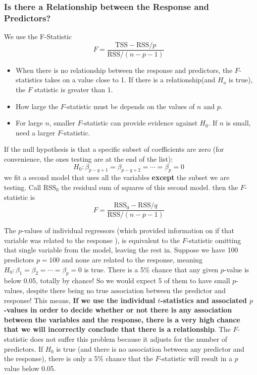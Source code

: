          \subsubsection*{Is there a Relationship between the Response and Predictors?}
         We use the F-Statistic
         \begin{equation*}\tag{3.23}
             F = \frac{\text{TSS}-\text{RSS}/p}{\text{RSS}/(n-p-1)}
          \end{equation*}
          \begin{itemize}
              \item When there is no relationship between the response and predictors, the $F$-statistics takes on a value close to 1.  If there is a relationship(and $H_a$ is true), the $F$ statistic is greater than 1.
              \item How large the $F$-statistic must be depends on the values of $n$ and $p$.
              \item For large $n$, smaller $F$-statistic can provide evidence against $H_0$.  If $n$ is small, need a larger $F$-statistic.
          \end{itemize}
          If the null hypothesis is that a specific subset of coefficients are zero (for convenience, the ones testing are at the end of the list):
          \begin{equation*}
              H_0: \beta_{p-q+1} = \beta_{p-q+2} = \cdots = \beta_{p} = 0
           \end{equation*}
           we fit a second model that uses all the variables \textbf{except} the subset we are testing.  Call $\text{RSS}_0$ the residual sum of squares of this second model.  then the $F$-statistic is
           \begin{equation*}\tag{3.24}
                             F = \frac{\text{RSS}_0-\text{RSS}/q}{\text{RSS}/(n-p-1)}
           \end{equation*}

           The $p$-values of individual regressors (which provided information on if that variable was related to the response ), is equivalent to the $F$-statistic omitting that single variable from the model, leaving the rest in.  Suppose we have 100 predictors $p=100$ and none are related to the response, meaning $H_0: \beta_1 = \beta_2 = \cdots = \beta_p = 0$ is true.  There is a 5\% chance that any given $p$-value is below 0.05, totally by chance!  So we would expect 5 of them to have small $p$-values, despite there being no true association between the predictor and response!  This means, \textbf{If we use the individual $t$-statistics and associated $p$-values in order to decide whether or not there is any association between the variables and the response, there is a very high chance that we will incorrectly conclude that there is a relationship}.  The $F$-statistic does not suffer this problem because it adjusts for the number of predictors.  If $H_0$ is true (and there is no association between any predictor and the response), there is only a 5\% chance that the $F$-statistic will result in a $p$ value below 0.05.

